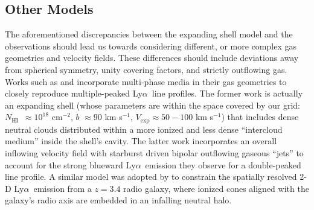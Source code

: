 \documentclass{emulateapj}
\newcommand{\lya}{Ly$\alpha$}
\def\nh{$N_{\mathrm{HI}}$}
\def\vexp{$V_{\mathrm{exp}}$}
\begin{document}
\subsection{Other Models}\label{subsec:OtherModels}
The aforementioned discrepancies between the expanding shell model and the observations should lead us towards considering different, or more complex gas geometries and velocity fields. These differences should include deviations away from spherical symmetry, unity covering factors, and strictly outflowing gas. Works such as \citet{christensen2012} and \citet{noterdaeme2012} incorporate multi-phase media in their gas geometries to closely reproduce multiple-peaked \lya\ line profiles. The former work is actually an expanding shell (whose parameters are within the space covered by our grid: \nh\ $\approx 10^{18}$ cm$^{-2}$, $b$ $\approx 90$ km s$^{-1}$, \vexp $\approx 50 - 100$ km s$^{-1}$) that includes dense neutral clouds distributed within a more ionized and less dense ``intercloud medium'' inside the shell's cavity. The latter work incorporates an overall inflowing velocity field with starburst driven bipolar outflowing gaseous ``jets'' to account for the strong blueward \lya\ emission they observe for a double-peaked line profile. A similar model was adopted by \citet{adams2009} to constrain the spatially resolved 2-D \lya\ emission from a $z=3.4$ radio galaxy, where ionized cones aligned with the galaxy's radio axis are embedded in an infalling neutral halo. 
\end{document}
